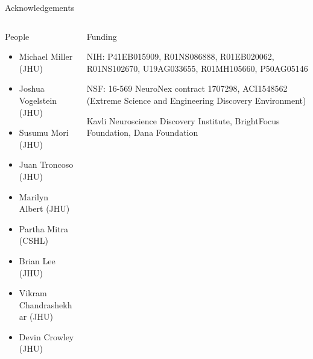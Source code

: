 \documentclass{beamer}
\begin{document}
\begin{frame}{Acknowledgements}

\begin{columns}
\begin{column}{0.5\textwidth}
People
\begin{itemize}
\item Michael Miller (JHU)
\item Joshua Vogelstein (JHU)
\item Susumu Mori (JHU)
\item Juan Troncoso (JHU)
\item Marilyn Albert (JHU)
\item Partha Mitra (CSHL)
\item Brian Lee (JHU)
\item Vikram Chandrashekhar (JHU)
\item Devin Crowley (JHU)

\end{itemize}
\end{column}

\begin{column}{0.5\textwidth}
Funding

\vspace{1em}

NIH: P41EB015909, R01NS086888, R01EB020062, R01NS102670, U19AG033655, R01MH105660, P50AG05146

\vspace{1em}

NSF: 16-569 NeuroNex contract 1707298, ACI1548562 (Extreme Science and Engineering Discovery Environment)

\vspace{1em}

Kavli Neuroscience Discovery Institute, BrightFocus Foundation, Dana Foundation

\end{column}
\end{columns}

\end{frame}
\end{document}
